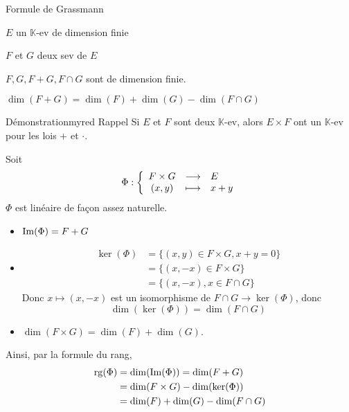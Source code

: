     \begin{theo}{Formule de Grassmann}{}
        \begin{soient}
            \item $E$ un $\mathbb{K}$-ev de dimension finie
            \item $F$ et $G$ deux sev de $E$
        \end{soient}
        \begin{alors}
            \item $F, G, F+G, F \cap G$ sont de dimension finie.
            \item $\dim(F+G) = \dim(F) + \dim(G) - \dim(F \cap G)$
        \end{alors}
    \end{theo}

    \begin{demo}{Démonstration}{myred}
        \textcolor{myred}{Rappel} \quad Si $E$ et $F$ sont deux $\mathbb{K}$-ev, alors $E \times F$ ont un $\mathbb{K}$-ev pour les lois $+$ et $\cdotp$.

        Soit 
        \[ \fonction{\Phi}{F \times G}{E}{(x,y)}{x + y} \]
        $\Phi$ est linéaire de façon assez naturelle. 
        \begin{itemize}
            \item $\operatorname{Im}(\Phi) = F + G$
            \item \begin{align*}
                \ker(\Phi) 
                & = \big\{ (x,y) \in F \times G, x + y = 0 \big\} \\
                &= \big\{ (x,-x) \in F \times G \big\} \\
                &= \big\{ (x,-x), x \in F \cap G \big\}
            \end{align*}
            Donc $x \mapsto (x,-x)$ est un isomorphisme de $F \cap G \to \ker(\Phi)$, donc 
            \[ \dim(\ker(\Phi)) = \dim(F \cap G) \]
            \item $\dim(F \times G) = \dim(F) + \dim(G)$.
        \end{itemize}
        Ainsi, par la formule du rang, 
        \begin{align*}
            \operatorname{rg}(\Phi) &= \dim(\operatorname{Im}(\Phi)) = \dim(F + G) \\
            &= \dim(F \times G) - \dim(\ker(\Phi)) \\
            &= \dim(F) + \dim(G) - \dim(F \cap G) 
        \end{align*}
    \end{demo}


